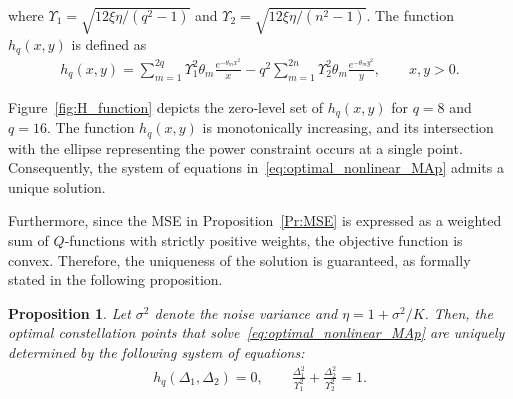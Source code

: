 \documentclass[journal,12pt,onecolumn,draftclsnofoot]{IEEEtran}
\newtheorem{prop}{Proposition}
\theoremstyle{definition}
\begin{document}
where $\Upsilon_1 = \sqrt{12\xi \eta / (q^2 - 1)}$ and $\Upsilon_2 = \sqrt{12\xi \eta / (n^2 - 1)}$. The function $h_q(x,y)$ is defined as
\begin{align}
    \nonumber
    h_q(x,y) =  
    \sum_{m=1}^{2q} \Upsilon_1^2 \theta_m \frac{e^{-\theta_m x^2}}{x}
    - q^2 \sum_{m=1}^{2n} \Upsilon_2^2\theta_m \frac{e^{-\theta_m y^2}}{y},
    \qquad x, y > 0.
\end{align}

Figure~\ref{fig:H_function} depicts the zero-level set of $h_q(x,y)$ for $q = 8$ and $q = 16$. The function $h_q(x,y)$ is monotonically increasing, and its intersection with the ellipse representing the power constraint occurs at a single point. Consequently, the system of equations in~\eqref{eq:optimal_nonlinear_MAp} admits a unique solution. 

Furthermore, since the MSE in Proposition~\ref{Pr:MSE} is expressed as a weighted sum of $Q$-functions with strictly positive weights, the objective function is convex. Therefore, the uniqueness of the solution is guaranteed, as formally stated in the following proposition.

% 

\begin{prop}\label{Pr:Optmizaiton-Map}
    Let $\sigma^2$ denote the noise variance and $\eta = 1 + \sigma^2 / K$. 
    Then, the optimal constellation points that solve~\eqref{eq:optimal_nonlinear_MAp} are uniquely determined by the following system of equations:
    \begin{align}
        \label{eq:uniqeg-MAp}
        h_q(\Delta_1, \Delta_2) = 0, 
        \qquad 
        \frac{\Delta_1^2}{\Upsilon_1^2} + \frac{\Delta_2^2}{\Upsilon_2^2} = 1.
    \end{align}
\end{prop}
\end{document}
